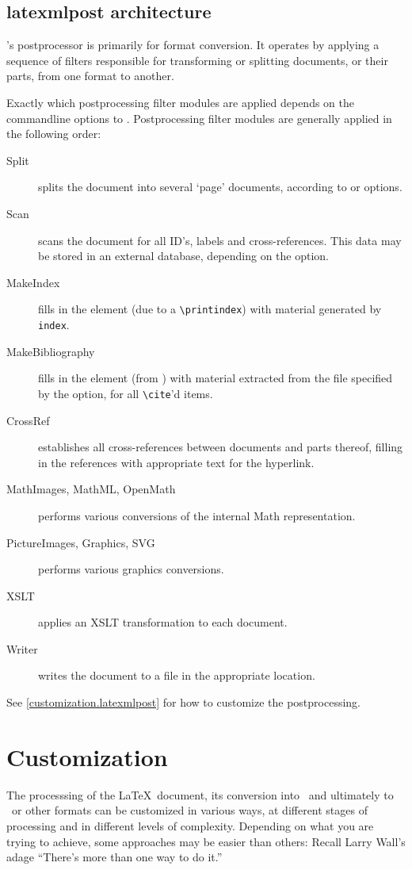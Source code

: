 \documentclass{book}
\begin{document}
\section{latexmlpost architecture}\label{latexmlpostarchitecture}
%
\LaTeXML's postprocessor is primarily for format conversion.
It operates by applying a sequence of filters responsible for
transforming or splitting documents, or their parts, from one format to another.

Exactly which postprocessing filter modules are applied depends
on the commandline options to .
Postprocessing filter modules are generally applied in the following order:
\begin{description}
  \item[Split] splits the document into several `page' documents,
   according to  or  options.
  \item[Scan] scans the document for all ID's, labels and cross-references.
    This data may be stored in an external database,  depending on the  option.
  \item[MakeIndex] fills in the  element (due to a \verb|\printindex|)
   with material generated by \verb|index|.
  \item[MakeBibliography] fills in the  element
   (from \verb||) with material extracted from the
   file specified by the  option, for all \verb|\cite|'d items.
  \item[CrossRef] establishes all cross-references between documents and
   parts thereof, filling in the references with appropriate text for the hyperlink.
  \item[MathImages, MathML, OpenMath] performs various conversions of the
   internal Math representation.
  \item[PictureImages, Graphics, SVG] performs various graphics conversions.
  \item[XSLT] applies an XSLT transformation to each document.
  \item[Writer] writes the document to a file in the appropriate location.
\end{description}
See \ref{customization.latexmlpost} for how to customize the postprocessing.

\chapter{Customization}\label{customization}
The processsing of the \LaTeX\ document, its  conversion into \XML\ and ultimately
to \XHTML\ or other formats can be customized in various ways, at
different stages of processing and in different levels of complexity.
Depending on what you are trying to achieve, some approaches may be easier
than others: Recall Larry Wall's adage ``There's more than one way to do it.''
\end{document}
